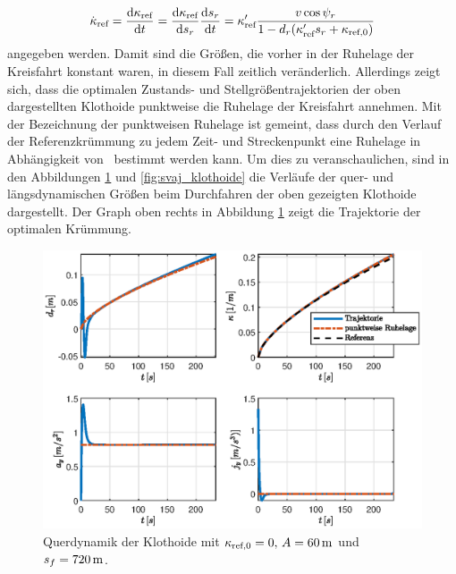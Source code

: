 \begin{equation}
	\dot{\kappa}_{\textrm{ref}} = \frac{\textrm{d}{\ensuremath{\kappa_{\textrm{ref}}}}}{\textrm{d}{t}} = \frac{\textrm{d}{\ensuremath{\kappa_{\textrm{ref}}}}}{\textrm{d}{s_r}} \frac{\textrm{d}{s_r}}{\textrm{d}{t}} = \kappa'_{\textrm{ref}} \frac{v\cos{\psi_r}}{1-d_r(\kappa'_{\textrm{ref}} s_r + \kappa_{\textrm{ref},0})}
\end{equation} 
angegeben werden. Damit sind die Größen, die vorher in der Ruhelage der Kreisfahrt konstant waren, in diesem Fall zeitlich veränderlich. Allerdings zeigt sich, dass die optimalen Zustands- und Stellgrößentrajektorien der oben dargestellten Klothoide punktweise die Ruhelage der Kreisfahrt annehmen. Mit der Bezeichnung der punktweisen Ruhelage ist gemeint, dass durch den Verlauf der Referenzkrümmung zu jedem Zeit- und Streckenpunkt eine Ruhelage in Abhängigkeit von \kapparefofs~bestimmt werden kann. Um dies zu veranschaulichen, sind in den Abbildungen \ref{fig:lat_dyn_klothoide} und \ref{fig:svaj_klothoide} die Verläufe der quer- und längsdynamischen Größen beim Durchfahren der oben gezeigten Klothoide dargestellt. Der Graph oben rechts in Abbildung \ref{fig:lat_dyn_klothoide} zeigt die Trajektorie der optimalen Krümmung. 
\begin{figure}[h] 
	\centering
	\includegraphics[width=\linewidth]{./Bilder/Ergebnisse/Klothoide/Ohne_umax/lat_dyn.eps}
	\caption{Querdynamik der Klothoide mit $\kappa_{\textrm{ref},0} = 0,\, A = 60\,\mathrm{m}$ und $s_f = 720\,\mathrm{m}$.}
	\label{fig:lat_dyn_klothoide}
\end{figure} 
